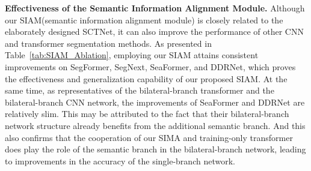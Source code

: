 \documentclass[letterpaper]{article} %
\begin{document}
\noindent
{\bf Effectiveness of the Semantic Information Alignment Module.}
Although our SIAM(semantic information alignment module) is closely related to the elaborately designed SCTNet, it can also improve the performance of other CNN and transformer segmentation methods. As presented in Table~\ref{tab:SIAM_Ablation}, employing our SIAM attains consistent improvements on SegFormer, SegNext, SeaFormer, and DDRNet, which proves the effectiveness and generalization capability of our proposed SIAM. At the same time, as representatives of the bilateral-branch transformer and the bilateral-branch CNN network, the improvements of SeaFormer and DDRNet are relatively slim. This may be attributed to the fact that their bilateral-branch network structure already benefits from the additional semantic branch. And this also confirms that the cooperation of our SIMA and training-only transformer does play the role of the semantic branch in the bilateral-branch network, leading to improvements in the accuracy of the single-branch network.
\begin{table}
\begin{center}
    \centering
\end{center}
    \caption{\textbf{Comparison of the effect of the SIAM.} 
    }
\label{tab:SIAM_Ablation}
\vspace{-5pt}
\end{table}
\end{document}

